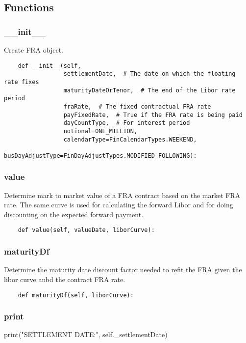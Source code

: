 \documentclass[twoside,11pt]{book}
\begin{document}
\subsection*{Functions}

\subsubsection*{{\bf \_\_init\_\_}}
Create FRA object.  

\begin{lstlisting}
    def __init__(self,
                 settlementDate,  # The date on which the floating rate fixes
                 maturityDateOrTenor,  # The end of the Libor rate period
                 fraRate,  # The fixed contractual FRA rate
                 payFixedRate,  # True if the FRA rate is being paid
                 dayCountType,  # For interest period
                 notional=ONE_MILLION,
                 calendarType=FinCalendarTypes.WEEKEND,
                 busDayAdjustType=FinDayAdjustTypes.MODIFIED_FOLLOWING):
\end{lstlisting}

\subsubsection*{{\bf value}}
Determine mark to market value of a FRA contract based on the market FRA rate. The same curve is used for calculating the forward Libor and for doing discounting on the expected forward payment.  

\begin{lstlisting}
    def value(self, valueDate, liborCurve):
\end{lstlisting}

\subsubsection*{{\bf maturityDf}}
Determine the maturity date discount factor needed to refit the FRA given the libor curve anbd the contract FRA rate.  

\begin{lstlisting}
    def maturityDf(self, liborCurve):
\end{lstlisting}

\subsubsection*{{\bf print}}
print("SETTLEMENT DATE:", self.\_settlementDate) 
\end{document}
